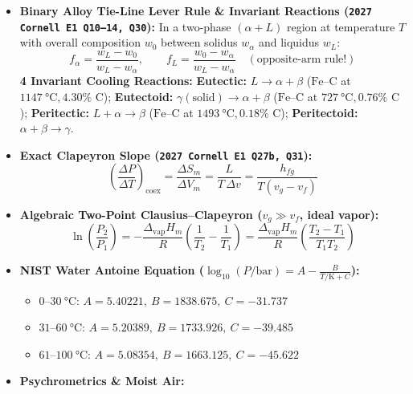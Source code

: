 \documentclass[10pt,twoside,openany,letterpaper]{book}
\begin{document}
\begin{quicksheet}
\begin{twocol}[0.50]
\begin{formulacard}
\begin{itemize}
  \[
    \boxed{y = (1 - x)y_f + x y_g = y_f + x y_{fg} \iff x = \frac{y - y_f}{y_{fg}}}, \quad y \in \{v, u, h, s\}
  \]
  \item \textbf{Binary Alloy Tie-Line Lever Rule \& Invariant Reactions (\texttt{2027 Cornell E1 Q10--14, Q30}):}
  In a two-phase $(\alpha + L)$ region at temperature $T$ with overall composition $w_0$ between solidus $w_\alpha$ and liquidus $w_L$:
  \[
    \boxed{f_\alpha = \frac{w_L - w_0}{w_L - w_\alpha}, \qquad f_L = \frac{w_0 - w_\alpha}{w_L - w_\alpha}} \quad (\text{opposite-arm rule!})
  \]
  \textbf{4 Invariant Cooling Reactions:} \textbf{Eutectic:} $L \to \alpha + \beta$ ($\mathrm{Fe\text{--}C}$ at $\SI{1147}{\celsius}, 4.30\%\text{ C}$); \textbf{Eutectoid:} $\gamma(\text{solid}) \to \alpha + \beta$ ($\mathrm{Fe\text{--}C}$ at $\SI{727}{\celsius}, 0.76\%\text{ C}$); \textbf{Peritectic:} $L + \alpha \to \beta$ ($\mathrm{Fe\text{--}C}$ at $\SI{1493}{\celsius}, 0.18\%\text{ C}$); \textbf{Peritectoid:} $\alpha + \beta \to \gamma$.
\end{itemize}
\end{formulacard}
\nextcol[0.48]
\begin{formulacard}
\scriptsize
\begin{itemize}
  \item \textbf{Exact Clapeyron Slope (\texttt{2027 Cornell E1 Q27b, Q31}):}
  \[
    \boxed{\left(\frac{\Delta P}{\Delta T}\right)_{\mathrm{coex}} = \frac{\Delta S_m}{\Delta V_m} = \frac{L}{T\,\Delta v} = \frac{h_{fg}}{T(v_g - v_f)}}
  \]
  \item \textbf{Algebraic Two-Point Clausius--Clapeyron ($v_g \gg v_f$, ideal vapor):}
  \[
    \boxed{\ln\left(\frac{P_2}{P_1}\right) = -\frac{\Delta_{\mathrm{vap}}H_m}{R}\left(\frac{1}{T_2} - \frac{1}{T_1}\right) = \frac{\Delta_{\mathrm{vap}}H_m}{R}\left(\frac{T_2 - T_1}{T_1 T_2}\right)}
  \]
  \item \textbf{NIST Water Antoine Equation ($\log_{10}(P/\si{\bar}) = A - \frac{B}{T/\si{\kelvin} + C}$):}
  \begin{itemize}
    \item $0\text{--}\SI{30}{\celsius}$: $A = 5.40221,\ B = 1838.675,\ C = -31.737$
    \item $31\text{--}\SI{60}{\celsius}$: $A = 5.20389,\ B = 1733.926,\ C = -39.485$
    \item $61\text{--}\SI{100}{\celsius}$: $A = 5.08354,\ B = 1663.125,\ C = -45.622$
  \end{itemize}
  \item \textbf{Psychrometrics \& Moist Air:}

\end{itemize}
\end{formulacard}
\end{twocol}
\end{quicksheet}
\end{document}
